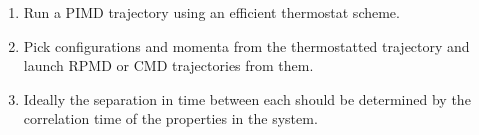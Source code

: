 \begin{frame}
\begin{itemize}
  \begin{enumerate}
    \setlength{\itemsep}{6pt}%
    \item Run a PIMD trajectory using an efficient thermostat scheme.
    \item Pick configurations and momenta from the thermostatted trajectory and
      launch RPMD or CMD trajectories from them.
    \item Ideally the separation in time between each should be determined by
      the correlation time of the properties in the system.
  \end{enumerate}
  \end{itemize}
 
\end{frame}
